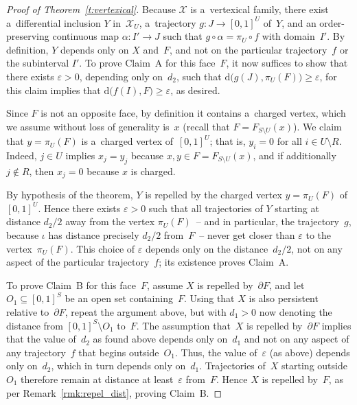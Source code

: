 \documentclass[pdftex]{sigma}
\begin{document}
\begin{proof}[Proof of Theorem~\ref{t:vertexical}]
Because $\mathcal X$ is a~vertexical family, there exist a~dif\/ferential inclusion $Y$ in~$\mathcal X_U$, a~trajectory
$g:J\to[0,1]^U$ of~$Y$, and an order-preserving continuous map $\alpha:I'\to J$ such that $g\circ\alpha=\pi_U\circ f$
with domain~$I'$.
By def\/inition, $Y$ depends only on $X$ and~$F$, and not on the particular trajectory~$f$ or the subinterval $I'$.
To prove Claim~A for this face~$F$, it now suf\/f\/ices to show that there exists $\varepsilon>0$, depending only
on~$d_2$, such that $\mathrm{d}\big(g(J),\pi_U(F)\big)\geq\varepsilon$, for this claim implies that
$\mathrm{d}\big(f(I),F\big)\geq\varepsilon$, as desired.

Since $F$ is not an opposite face, by def\/inition it contains a~charged vertex, which we assume without loss of
generality is~$x$ (recall that $F=F_{S\setminus U}(x)$).
We claim that $y=\pi_U(F)$ is a~charged vertex of~$[0,1]^U$; that is, $y_i=0$ for all $i\in U\setminus R$.
Indeed, $j\in U$ implies $x_j=y_j$ because $x,y\in F=F_{S\setminus U}(x)$, and if additionally $j\notin R$, then
$x_j=0$ because $x$ is charged.

By hypothesis of the theorem, $Y$ is repelled by the charged vertex $y=\pi_U(F)$ of~$[0,1]^U$.
Hence there exists $\varepsilon>0$ such that all trajectories of $Y$ starting at distance $d_2/2$ away from the vertex
$\pi_U(F)$~-- and in particular, the trajectory~$g$, because $\iota$ has distance precisely $d_2/2$ from~$F$~-- never get
closer than $\varepsilon$ to the vertex~$\pi_U(F)$.
This choice of $\varepsilon$ depends only on the distance~$d_2/2$, not on any aspect of the particular trajectory~$f$;
its existence proves Claim~A.

To prove Claim~B for this face~$F$, assume $X$ is repelled by~$\partial F$, and let $O_1\subseteq[0,1]^S$ be an open
set containing~$F$.
Using that $X$ is also persistent relative to~$\partial F$, repeat the argument above, but with $d_1>0$ now denoting
the distance from $[0,1]^S\setminus O_1$ to~$F$.
The assumption that~$X$ is repelled by~$\partial F$ implies that the value of~$d_2$ as found above depends only
on~$d_1$ and not on any aspect of any trajectory~$f$ that begins outside~$O_1$.
Thus, the value of~$\varepsilon$ (as above) depends only on~$d_2$, which in turn depends only on~$d_1$.
Trajectories of~$X$ starting outside~$O_1$ therefore remain at distance at least~$\varepsilon$ from~$F$.
Hence $X$ is repelled by~$F$, as per Remark~\ref{rmk:repel_dist}, proving Claim~B.
\end{proof}
\end{document}
